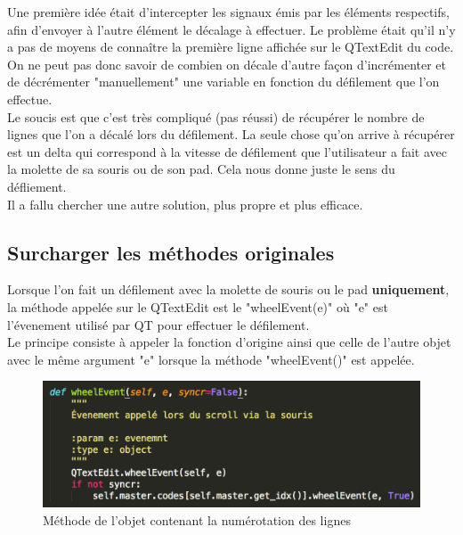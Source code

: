 \documentclass[a4paper,12pt]{article}
\begin{document}
		Une première idée était d'intercepter les signaux émis par les éléments respectifs, afin d'envoyer à l'autre élément le décalage à effectuer. Le problème était qu'il n'y a pas de moyens de connaître la première ligne affichée sur le QTextEdit du code. On ne peut pas donc savoir de combien on décale d'autre façon d'incrémenter et de décrémenter "manuellement" une  variable en fonction du défilement que l'on effectue.\\
		
		Le soucis est que c'est très compliqué (pas réussi) de récupérer le nombre de lignes que l'on a décalé lors du défilement. La seule chose qu'on arrive à récupérer est un delta qui correspond à la vitesse de défilement que l'utilisateur a fait avec la molette de sa souris ou de son pad. Cela nous donne juste le sens du défliement.\\
		
		Il a fallu chercher une autre solution, plus propre et plus efficace.
		
	\subsection{Surcharger les méthodes originales}
		
		Lorsque l'on fait un défilement avec la molette de souris ou le pad \textbf{uniquement}, la méthode appelée sur le QTextEdit est le "wheelEvent(e)" où "e" est l'évenement utilisé par QT pour effectuer le défilement.\\
		
		Le principe consiste à appeler la fonction d'origine ainsi que celle de l'autre objet avec le même argument "e" lorsque la méthode "wheelEvent()" est appelée.
		
		\newpage		
		
		\begin{figure}[h!]
			\begin{center}
				\includegraphics[scale=0.9]{images/wheel_lines}
				\caption{Méthode de l'objet contenant la numérotation des lignes}
			\end{center}
		\end{figure}
		
\end{document}

